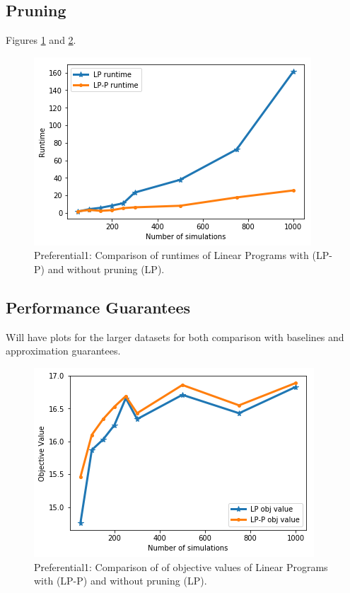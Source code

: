 \subsection{Pruning}
Figures \ref{fig:pa1pruningtime} and \ref{fig:pa1pruningobj}.
\begin{figure}[!h]
    \centering
    \includegraphics[scale = 0.55]{Figuresnew/pa1_runtime.png}
    \caption{Preferential1: Comparison of runtimes of Linear Programs with (LP-P) and without pruning (LP). }
    \label{fig:pa1pruningtime}
\end{figure}
\subsection{Performance Guarantees}
Will have plots for the larger datasets for both comparison with baselines and approximation guarantees.



\begin{figure}[!h]
    \centering
    \includegraphics[scale = 0.55]{Figuresnew/pa1_objpruning.png}
    \caption{Preferential1: Comparison of of objective values of Linear Programs with (LP-P) and without pruning (LP). }
    \label{fig:pa1pruningobj}
\end{figure}


